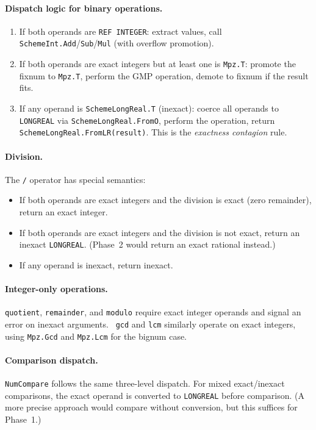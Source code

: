 \documentclass[12pt]{article}
\begin{document}
\paragraph{Dispatch logic for binary operations.}
\begin{enumerate}[nosep]
\item If both operands are {\tt REF INTEGER}: extract values,
  call {\tt SchemeInt.Add}/{\tt Sub}/{\tt Mul} (with overflow
  promotion).

\item If both operands are exact integers but at least one is
  {\tt Mpz.T}: promote the fixnum to {\tt Mpz.T}, perform the
  GMP operation, demote to fixnum if the result fits.

\item If any operand is {\tt SchemeLongReal.T} (inexact): coerce
  all operands to {\tt LONGREAL} via {\tt SchemeLongReal.FromO},
  perform the operation, return {\tt SchemeLongReal.FromLR(result)}.
  This is the \emph{exactness contagion} rule.
\end{enumerate}

\paragraph{Division.}
The {\tt /} operator has special semantics:
\begin{itemize}[nosep]
\item If both operands are exact integers and the division is
  exact (zero remainder), return an exact integer.
\item If both operands are exact integers and the division is
  not exact, return an inexact {\tt LONGREAL}.  (Phase~2 would
  return an exact rational instead.)
\item If any operand is inexact, return inexact.
\end{itemize}

\paragraph{Integer-only operations.}
{\tt quotient}, {\tt remainder}, and {\tt modulo} require exact
integer operands and signal an error on inexact arguments.  {\tt
gcd} and {\tt lcm} similarly operate on exact integers, using
{\tt Mpz.Gcd} and {\tt Mpz.Lcm} for the bignum case.

\paragraph{Comparison dispatch.}
{\tt NumCompare} follows the same three-level dispatch.  For
mixed exact/inexact comparisons, the exact operand is converted
to {\tt LONGREAL} before comparison.  (A more precise approach
would compare without conversion, but this suffices for Phase~1.)
\end{document}
